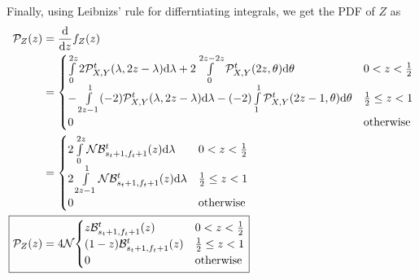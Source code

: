Finally, using Leibnizs' rule for differntiating integrals, we get the PDF of $Z$ as
\begin{align*}
    \mathcal{P}_Z(z) &= \dv{}{z}f_Z(z) \\
    &= \begin{cases}
        \int\limits_0^{2z}2\mathcal{P}_{X,Y}^t(\lambda,2z-\lambda)\dd\lambda + 2\int\limits_0^{2z - 2z}\mathcal{P}_{X,Y}^t(2z,\theta)\dd\theta & 0 < z < \tfrac{1}{2} \\
        -\int\limits_{2z-1}^1(-2)\mathcal{P}_{X,Y}^t(\lambda,2z-\lambda)\dd\lambda - (-2)\int\limits_1^1\mathcal{P}_{X,Y}^t(2z-1,\theta)\dd\theta & \tfrac{1}{2} \leq z < 1 \\
        0 & \text{otherwise}
    \end{cases} \\
    &= \begin{cases}
        2\int\limits_0^{2z}\mathcal{N}\mathcal{B}_{s_t+1,f_t+1}^t(z)\dd\lambda & 0 < z < \tfrac{1}{2} \\
        2\int\limits_{2z-1}^1\mathcal{N}\mathcal{B}_{s_t+1,f_t+1}^t(z)\dd\lambda & \tfrac{1}{2} \leq z < 1 \\
        0 & \text{otherwise}
    \end{cases} \\
    \Aboxed{\mathcal{P}_Z(z) &= 4\mathcal{N}{\begin{cases}
        z\mathcal{B}_{s_t+1,f_t+1}^t(z) & 0 < z < \tfrac{1}{2} \\
        (1 - z)\mathcal{B}_{s_t+1,f_t+1}^t(z) & \tfrac{1}{2} \leq z < 1 \\
        0 & \text{otherwise}
    \end{cases}}}
\end{align*}
